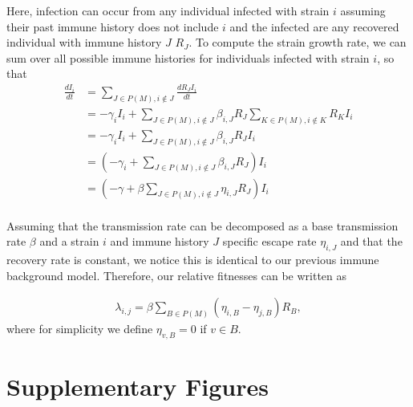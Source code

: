 \documentclass[11pt,oneside,letterpaper]{article}
\newcommand{\varEscape}{\eta}
\begin{document}
Here, infection can occur from any individual infected with strain $i$ assuming their past immune history does not include $i$ and the infected are any recovered individual with immune history $J$  $R_{J}$.
To compute the strain growth rate, we can sum over all possible immune histories for individuals infected with strain $i$, so that
\begin{align*}
    \frac{d I_{i}}{d t} &= \sum_{J \in P(M), i \notin J} \frac{dR_{J} I_{i}}{dt} \\
                        &= - \gamma_{i} I_{i} + \sum_{J \in P(M), i \notin J} \beta_{i, J} R_{J} \sum_{K \in P(M), i\notin K} R_{K}I_{i}\\
                        &= - \gamma_{i} I_{i} + \sum_{J \in P(M), i \notin J} \beta_{i, J} R_{J} I_{i}\\
                        &= \left(-\gamma_{i} + \sum_{J \in P(M), i \notin J} \beta_{i,J} R_{J} \right) I_{i}\\
                        &= \left(-\gamma + \beta\sum_{J \in P(M), i \notin J} \varEscape_{i,J} R_{J} \right) I_{i}\\
\end{align*}

Assuming that the transmission rate can be decomposed as a base transmission rate $\beta$ and a strain $i$ and immune history $J$ specific escape rate $\varEscape_{i, J}$ and that the recovery rate is constant, we notice this is identical to our previous immune background model.
Therefore, our relative fitnesses can be written as

\begin{align*}
    \lambda_{i, j} = \beta \sum_{B \in P(M)} (\varEscape_{i, B} - \varEscape_{j, B}) R_{B},
\end{align*}
where for simplicity we define $\varEscape_{v, B} = 0$ if $v \in B$.

\section*{Supplementary Figures}
\end{document}
